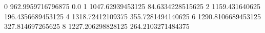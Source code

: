 0 962.9959716796875 0.0
1 1047.62939453125 84.6334228515625
2 1159.431640625 196.4356689453125
4 1318.72412109375 355.7281494140625
6 1290.8106689453125 327.814697265625
8 1227.206298828125 264.2103271484375
